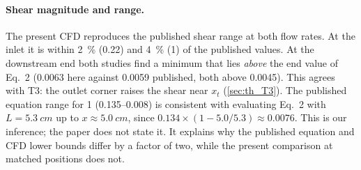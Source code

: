 \begin{table}[htbp]
\centering
\caption{Published values \tagP\ \citep{Delon2020} compared with the present CFD \tagC\ and Eq.~2 evaluated for the present geometry \tagT. Shear in \si{\dyncm}. ``Upper/lower'' are the extreme values along the axis of the cell-culture section. $\tau_{\mathrm{cell}}=3\taw$ follows the paper.}
\label{tab:published_compare}
\small
{}
\end{table}

\paragraph{Shear magnitude and range.} The present CFD reproduces the published shear range at both flow rates. At the inlet it is within \SI{2}{\percent} (0.22) and \SI{4}{\percent} (1) of the published values. At the downstream end both studies find a minimum that lies \emph{above} the end value of Eq.~2 (0.0063 here against 0.0059 published, both above 0.0045). This agrees with T3: the outlet corner raises the shear near $x_t$ (\cref{sec:th_T3}). The published equation range for \SI{1}{\uLmin} (0.135--\SI{0.008}{\dyncm}) is consistent with evaluating Eq.~2 with $L=\SI{5.3}{cm}$ up to $x\approx\SI{5.0}{cm}$, since $0.134\times(1-5.0/5.3)\approx0.0076$. This is our inference; the paper does not state it. It explains why the published equation and CFD lower bounds differ by a factor of two, while the present comparison at matched positions does not.

